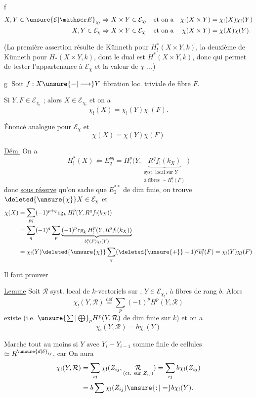 
\textcircled{f}
\[
\begin{aligned}
X,Y\in\unsure{\mathcal E|\mathscr E}_{\chi_!}&\Rightarrow X\times Y\in\mathcal E_{\chi_!} &&\text{et on a} &\chi_!(X\times Y)&=\chi_!(X)\chi_!(Y)\\
X,Y\in\mathcal E_\chi&\Rightarrow X\times Y\in\mathcal E_\chi &&\text{et on a} &\chi(X\times Y)&=\chi(X)\chi(Y).
\end{aligned}
\]

(La première assertion résulte de Künneth pour $H^*_!(X\times Y,k)$, la deuxième de Künneth pour $H_*(X\times Y,k)$, dont le dual est $H^*(X\times Y,k)$, donc qui permet de tester l'appartenance à $\mathcal E_\chi$ et la valeur de $\chi$ $\ldots$)

\textcircled{g} Soit $f:X\unsure{-|\longrightarrow}Y$ fibration loc. triviale de fibre $F$.

Si $Y,F\in\mathcal E_{\chi_!}$ ; alors $X\in\mathcal E_{\chi_!}$ et on a
\[
\chi_!(X)=\chi_!(Y)\chi_!(F).
\]

Énoncé analogue pour  $\mathcal E_\chi$ et 
\[
\chi(X)=\chi(Y)\chi(F)
\]

\uline{Dém.} On a
\[
H^*_!(X)\Leftarrow E_2^{pq}=H^p_!\bigl(Y,\underbrace{R^q f_!(k_X)}_{\substack{\text{syst. local sur }Y\\\text{à fibres }\sim H^q_!(F)}}\bigr)
\]
donc \uline{sous réserve} qu'on sache que $E_2^{**}$ de dim finie, on trouve $\deleted{\unsure{\chi}}X\in\mathcal E_\chi$ et
\[
\begin{aligned}
\chi(X)&=\sum_{pq}(-1)^{p+q}\operatorname{rg}_k H^p_!(Y,R^q f_!(k_X))\\
&=\sum_q(-1)^q\sum_p\underbrace{(-1)^p\operatorname{rg}_k H^p_!(Y,R^q f_!(k_X))}_{b^q_!(F)\chi_!(Y)}\\
&=\chi_!(Y)\deleted{\unsure{\chi}}\sum_q(\deleted{\unsure{+}}-1)^q b^q_!(F)=\chi_!(Y)\chi_!(F)
\end{aligned}
\]

Il faut prouver

\uline{Lemme} Soit $\mathcal R$ syst. local de $k$-vectoriels sur , $Y\in\mathcal E_{\chi_!}$, à fibres de rang  $b$. Alors
\[
\chi_!(Y,\mathcal R)\overset{\mathrm{déf}}{=}\sum_p(-1)^p H^p(Y,\mathcal R)
\]
existe (i.e. $\unsure{\sum|\bigoplus}_p H^p(Y,\mathcal R)$ de dim finie sur $k$) et on a
\[
\chi_!(Y,\mathcal R)=b\chi_!(Y)
\]

Marche tout au moins si $Y$   avec $Y_i-Y_{i-1}$ somme finie de cellules  $\simeq R^{\unsure{d|\delta}_{ij}}$, car
On aura
\[
\begin{aligned}
\chi_!(Y,\mathcal R)&=\sum_{ij}\chi_!(Z_{ij},\underset{(\text{ct. sur }Z_{ij})}{\mathcal R})=\sum_{ij}b\chi_!(Z_{ij})\\
&=b\sum\chi_!(Z_{ij})\unsure{\mathpunct{:}|=}b\chi_!(Y).
\end{aligned}
\]


